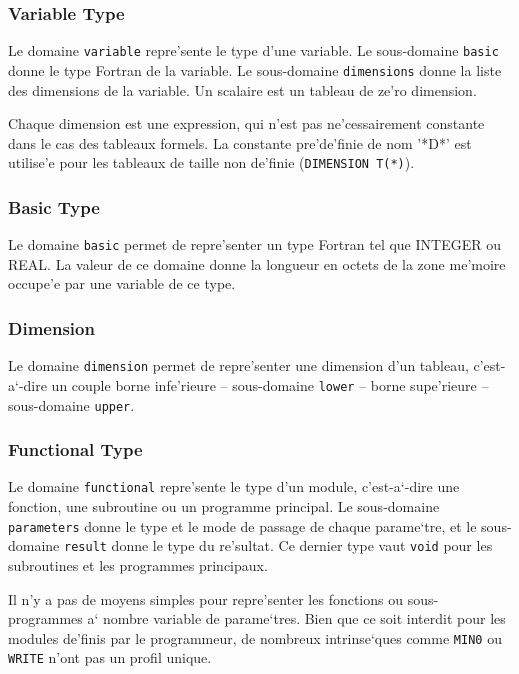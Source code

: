 \subsubsection{Variable Type}
\label{subsubsection-variable}

{
Le domaine \verb/variable/ repre'sente le type d'une variable.  Le
sous-domaine \verb/basic/ donne le type Fortran de la variable.  Le
sous-domaine \verb/dimensions/ donne la liste des dimensions de la variable.
Un scalaire est un tableau de ze'ro dimension.

Chaque dimension est une expression, qui n'est pas ne'cessairement
constante dans le cas des tableaux formels. La constante pre'de'finie de
nom '*D*' est utilise'e pour les tableaux de taille non de'finie
(\verb/DIMENSION T(*)/).
}

\subsubsection{Basic Type}
\label{subsubsection-basic}

{
Le domaine \verb/basic/ permet de repre'senter un type Fortran tel que
INTEGER ou REAL. La valeur de ce domaine donne la longueur en octets de
la zone me'moire occupe'e par une variable de ce type.
}

\subsubsection{Dimension}
\label{subsubsection-dimension}

{
Le domaine \verb/dimension/ permet de repre'senter une dimension d'un
tableau, c'est-a`-dire un couple borne infe'rieure -- sous-domaine
\verb/lower/ -- borne supe'rieure -- sous-domaine \verb/upper/.
}

\subsubsection{Functional Type}
\label{subsubsection-functional}

{ Le domaine \verb/functional/ repre'sente le type d'un module,
c'est-a`-dire une fonction, une subroutine ou un programme principal. Le
sous-domaine \verb/parameters/ donne le type et le mode de passage de
chaque parame`tre, et le sous-domaine \verb/result/ donne le type du
re'sultat. Ce dernier type vaut \verb/void/ pour les subroutines et les
programmes principaux.

Il n'y a pas de moyens simples pour repre'senter les fonctions ou
sous-programmes a` nombre variable de parame`tres. Bien que ce soit
interdit pour les modules de'finis par le programmeur, de nombreux
intrinse`ques comme \verb+MIN0+ ou \verb+WRITE+ n'ont pas un profil
unique.  }

